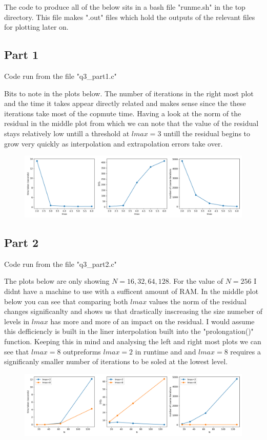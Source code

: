 \documentclass[a4paper]{article}
\begin{document}
	The code to produce all of the below sits in a bash file "runme.sh" in the top 
	directory. This file makes ".out" files which hold the outputs of the relevant
	files for plotting later on. 

\subsection*{Part 1}
	
	Code run from the file "q3\_part1.c"
	
	Bits to note in the plots below. The number of iterations in the right most plot
	and the time it takes appear directly related and makes sense since the these
	iterations take most of the copmute time. Having a look at the norm of the 
	residual in the middle plot from which we can note that the value of the residual 
	stays relatively low untill a threshold at $lmax = 3$ untill the residual begins to 
	grow very quickly as interpolation and extrapolation errors 
	take over.

	\begin{figure}[h!]
	    \centering
    	\includegraphics[width=1\linewidth]{./q3_part1.png}
	\end{figure}

\vspace{2cm}


\subsection*{Part 2}
		
	Code run from the file "q3\_part2.c"

	The plots below are only showing $N = 16, 32, 64, 128$. For the value of $N=256$
	I didnt have a machine to use with a sufficent amount of RAM. In the middle plot 
	below you can see that comparing both $lmax$ values the norm of the residual
	changes significanlty and shows us that drastically inscreasing the size numeber
	of levels in $lmax$ has more and more of an impact on the residual. I would assume
	this defficiencly is built in the liner interpolation built into the "prolongation()"
	function. Keeping this in mind and analysing the 
	left and right most plots we can see that $lmax=8$ outpreforms $lmax=2$ in runtime and
	and $lmax=8$ requires a significanly smaller number of iterations to be soled at the
	lowest level.  

		
	\begin{figure}[h!]
	    \centering
    	\includegraphics[width=1\linewidth]{./q3_part2.png}
	\end{figure}
	

 
 
\end{document}
